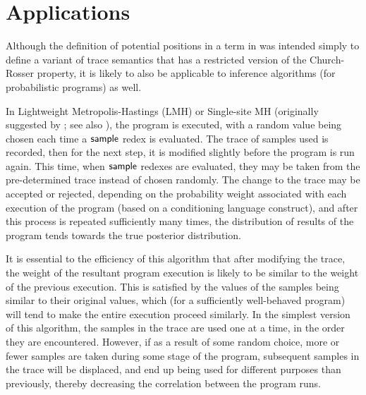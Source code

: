 \section{Applications}
\label{sec:applications}
Although the definition of potential positions in a term in  was intended simply to define a variant of trace semantics that has a restricted version of the Church-Rosser property, it is likely to also be applicable to inference algorithms (for probabilistic programs) as well.


In Lightweight Metropolis-Hastings (LMH) or Single-site MH (originally suggested by \cite{wingate2011lightweight}; see also \cite{rainforth2017Automating}),
the program is executed, with a random value being chosen each time a $\mathsf{sample}$ redex is evaluated. The trace of samples used is recorded, then for the next step, it is modified slightly before the program is run again. This time, when $\mathsf{sample}$ redexes are evaluated, they may be taken from the pre-determined trace instead of chosen randomly. The change to the trace may be accepted or rejected, depending on the probability weight associated with each execution of the program (based on a conditioning language construct), and after this process is repeated sufficiently many times, the distribution of results of the program tends towards the true posterior distribution.

It is essential to the efficiency of this algorithm that after modifying the trace, the weight of the resultant program execution is likely to be similar to the weight of the previous execution. This is satisfied by the values of the samples being similar to their original values, which (for a sufficiently well-behaved program) will tend to make the entire execution proceed similarly. In the simplest version of this algorithm, the samples in the trace are used one at a time, in the order they are encountered. However, if as a result of some random choice, more or fewer samples are taken during some stage of the program, subsequent samples in the trace will be displaced, and end up being used for different purposes than previously, thereby decreasing the correlation between the program runs.

